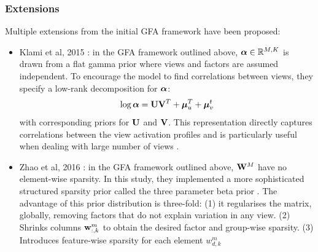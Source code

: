\subsubsection{Extensions}
Multiple extensions from the initial GFA framework have been proposed:

\begin{itemize}
	\item Klami et al, 2015 \cite{Klami2015}: in the GFA framework outlined above, $\mbox{\boldmath $\alpha$} \in \mathbb{R}^{M,K}$ is drawn from a flat gamma prior where views and factors are assumed independent. To encourage the model to find correlations between views, they specify a low-rank decomposition for $\mbox{\boldmath $\alpha$}$:
	\[
		\log \mbox{\boldmath $\alpha$} = {\bf U} {\bf V}^T + \mbox{\boldmath $\mu$}_{u}^T + \mbox{\boldmath $\mu$}_{v}^t
	\]
	with corresponding priors for ${\bf U}$ and ${\bf V}$. This representation directly captures correlations between the view activation profiles and is particularly useful when dealing with large number of views \cite{Klami2015}.

	\item Zhao et al, 2016 \cite{Zhao2016}: in the GFA framework outlined above, ${\bf W}^M$ have no element-wise sparsity. In this study, they implemented a more sophisticated structured sparsity prior called the three parameter beta prior \cite{Armagan2011}. The advantage of this prior distribution is three-fold: (1) it regularises the matrix, globally, removing factors that do not explain variation in any view. (2) Shrinks columns ${\bf w}_{:,k}^{m}$ to obtain the desired factor and group-wise sparsity. (3) Introduces feature-wise sparsity for each element $w_{d,k}^{m}$
 





\end{itemize}

